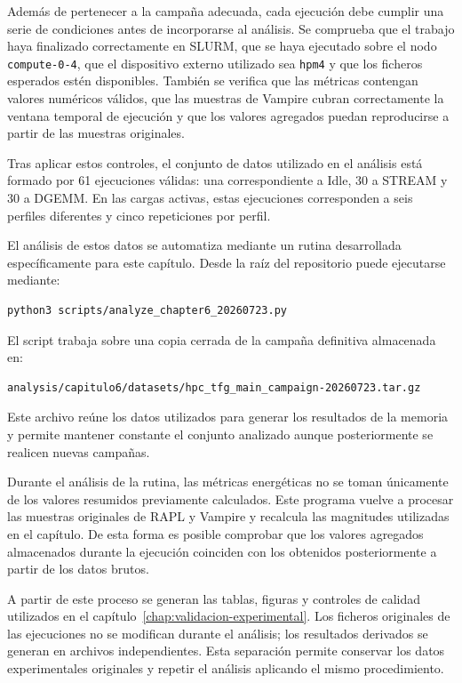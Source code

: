 Además de pertenecer a la campaña adecuada, cada ejecución debe cumplir una serie de condiciones antes de incorporarse al análisis. Se comprueba que el trabajo haya finalizado correctamente en SLURM, que se haya ejecutado sobre el nodo \texttt{compute-0-4}, que el dispositivo externo utilizado sea \texttt{hpm4} y que los ficheros esperados estén disponibles. También se verifica que las métricas contengan valores numéricos válidos, que las muestras de Vampire cubran correctamente la ventana temporal de ejecución y que los valores agregados puedan reproducirse a partir de las muestras originales.

Tras aplicar estos controles, el conjunto de datos utilizado en el análisis está formado por 61 ejecuciones válidas: una correspondiente a Idle, 30 a STREAM y 30 a DGEMM. En las cargas activas, estas ejecuciones corresponden a seis perfiles diferentes y cinco repeticiones por perfil.

El análisis de estos datos se automatiza mediante un rutina desarrollada específicamente para este capítulo. Desde la raíz del repositorio puede ejecutarse mediante:

\begin{lstlisting}[style=Consola]
python3 scripts/analyze_chapter6_20260723.py
\end{lstlisting}

El script trabaja sobre una copia cerrada de la campaña definitiva almacenada en:

\begin{lstlisting}[style=Consola]
analysis/capitulo6/datasets/hpc_tfg_main_campaign-20260723.tar.gz
\end{lstlisting}

Este archivo reúne los datos utilizados para generar los resultados de la memoria y permite mantener constante el conjunto analizado aunque posteriormente se realicen nuevas campañas.

Durante el análisis de la rutina, las métricas energéticas no se toman únicamente de los valores resumidos previamente calculados. Este programa vuelve a procesar las muestras originales de RAPL y Vampire y recalcula las magnitudes utilizadas en el capítulo. De esta forma es posible comprobar que los valores agregados almacenados durante la ejecución coinciden con los obtenidos posteriormente a partir de los datos brutos.

A partir de este proceso se generan las tablas, figuras y controles de calidad utilizados en el capítulo~\ref{chap:validacion-experimental}. Los ficheros originales de las ejecuciones no se modifican durante el análisis; los resultados derivados se generan en archivos independientes. Esta separación permite conservar los datos experimentales originales y repetir el análisis aplicando el mismo procedimiento.